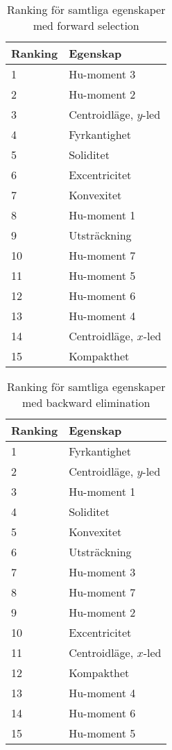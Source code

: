 \documentclass[../rapport_MVEX01-11-05]{subfiles}
\begin{document}
\begin{table}[tb]
	\centering
	\caption{Ranking för samtliga egenskaper med forward selection}
	
	\label{tab:bestfeatsfwd}
	\begin{tabular}{ll}
		\toprule
		Ranking & Egenskap \\
		\midrule
		1 & Hu-moment 3 \\
		2 & Hu-moment 2 \\
		3 & Centroidläge, $y$-led \\
		4 & Fyrkantighet \\
		5 & Soliditet \\
		6 & Excentricitet \\
		7 & Konvexitet \\
		8 & Hu-moment 1 \\
                9 & Utsträckning \\
                10 & Hu-moment 7 \\
                11 & Hu-moment 5 \\
                12 & Hu-moment 6 \\
                13 & Hu-moment 4 \\
                14 & Centroidläge, $x$-led \\
                15 & Kompakthet\\
		\bottomrule
	\end{tabular}
\end{table}
\begin{table}[tb]
	\centering
	\caption{Ranking för samtliga egenskaper med backward
          elimination}
	
	\label{tab:featsbwd}
	\begin{tabular}{ll}
		\toprule
		Ranking & Egenskap \\
		\midrule
                1 & Fyrkantighet \\
                2 & Centroidläge, $y$-led \\
                3 & Hu-moment 1\\
                4 & Soliditet\\
                5 & Konvexitet \\
                6 & Utsträckning \\
                7 & Hu-moment 3 \\
                8 & Hu-moment 7 \\
                9 & Hu-moment 2 \\
                10 & Excentricitet \\
                11 & Centroidläge, $x$-led \\
                12 & Kompakthet \\
                13 & Hu-moment 4 \\
                14 & Hu-moment 6 \\
                15 & Hu-moment 5 \\
		\bottomrule
	\end{tabular}
\end{table}
\end{document}
